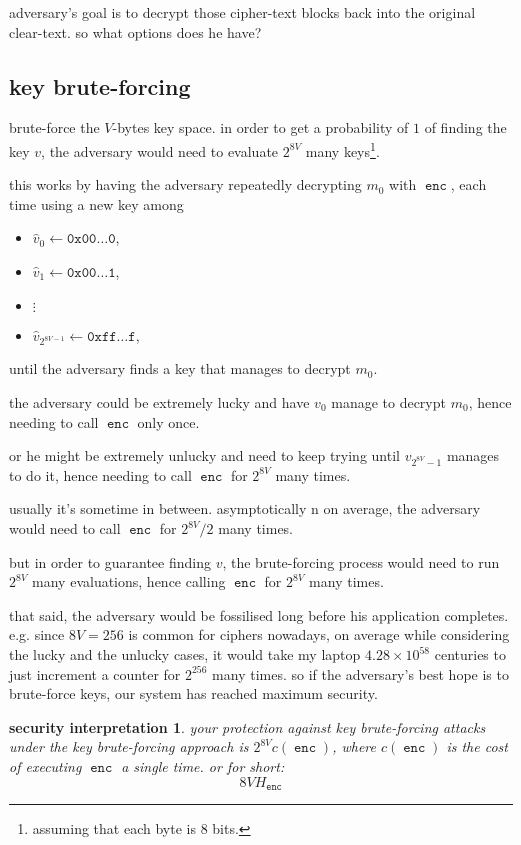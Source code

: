 \documentclass[twocolumn]{article}
\newtheorem{security}{security interpretation}
\DeclareMathOperator{\enc}{\texttt{enc}}
\begin{document}
adversary's goal is to decrypt those cipher-text blocks back into the
original clear-text.  so what options does he have?

\subsection{key brute-forcing}
brute-force the $V$-bytes key space.  in order to get a probability of $1$
of finding the key $v$, the adversary would need to evaluate $2^{8V}$ many
keys\footnote{assuming that each byte is $8$ bits.}.

this works by having the adversary repeatedly decrypting $m_0$ with $\enc$,
each time using a new key among
\begin{itemize}
    \item $\hat v_0 \gets \texttt{0x00\ldots 0}$,
    \item $\hat v_1 \gets \texttt{0x00\ldots 1}$,
    \item $\vdots$
    \item $\hat v_{2^{8V-1}} \gets \texttt{0xff\ldots f}$,
\end{itemize}
until the adversary finds a key that manages to decrypt $m_0$.

the adversary could be extremely lucky and have $v_0$ manage to decrypt
$m_0$, hence needing to call $\enc$ only once.  

or he might be extremely unlucky and need to keep trying until
$v_{2^{8V}-1}$ manages to do it, hence needing to call $\enc$ for $2^{8V}$
many times.

usually it's sometime in between.  asymptotically  n on average, the
adversary would need to call $\enc$ for $2^{8V}/2$ many times.

but in order to guarantee finding $v$, the brute-forcing process would need
to run $2^{8V}$ many evaluations, hence calling $\enc$ for $2^{8V}$ many
times.

that said, the adversary would be fossilised long before his application
completes.  e.g.  since $8V = 256$ is common for ciphers nowadays, on
average while considering the lucky and the unlucky cases, it would take my
laptop $4.28\times10^{58}$ centuries to just increment a counter for
$2^{256}$ many times.  so if the adversary's best hope is to brute-force
keys, our system has reached maximum security.

\begin{security}
your protection against key brute-forcing attacks under the key
brute-forcing approach is $2^{8V} c(\enc)$, where $c(\enc)$ is the cost of
executing $\enc$ a single time.  or  for short:
\[
    8V H_{\enc}
\]
\end{security}
\end{document}
